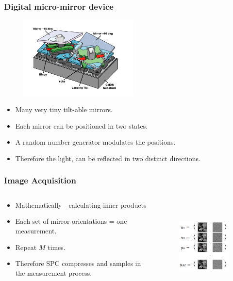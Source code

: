 \documentclass{beamer}
\begin{document}
    \begin{frame}
      \frametitle{Digital micro-mirror device }
      \begin{figure}[h]
        \centering
        \includegraphics[width = 6cm]{DMD.png}
      \end{figure}
      \begin{itemize}
        \item Many very tiny tilt-able mirrors. 
        \item Each mirror can be positioned in two states. 
          \item A random number generator modulates the positions. 
            \item Therefore the light, can be reflected in two distinct directions. 
      \end{itemize}
    \end{frame}

    \begin{frame}
      \frametitle{Image Acquisition}
\begin{columns}
\begin{column}{.48\textwidth}
  \begin{itemize}
  \item Mathematically - calculating inner products
    \item Each set of mirror orientations = one measurement.
      \item Repeat $M$ times.
 \item Therefore SPC compresses and samples in the measurement process.
  \end{itemize}
\end{column}

\begin{column}{.48\textwidth}
  \begin{figure}[h]
\includegraphics[height = 5cm]{sampling.png}    

  \end{figure}

\end{column}%
\end{columns}
      


    \end{frame}
\end{document}
